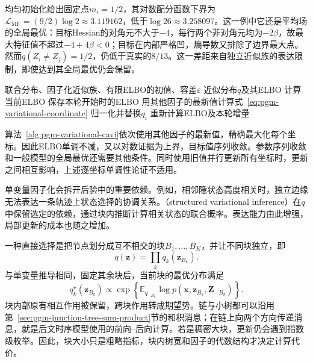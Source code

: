 均匀初始化给出固定点$m_i=1/2$，其对数配分函数下界为$\mathcal L_{\mathrm{MF}}=(9/2)\log2\approx3.119162$，低于$\log26\approx3.258097$。这一例中它还是平均场的全局最优：目标Hessian的对角元不大于$-4$，每行两个非对角元均为$-2\beta$，故最大特征值不超过$-4+4\beta<0$；目标在内部严格凹，熵导数又排除了边界最大点。然而$q(Z_i\ne Z_j)=1/2$，仍低于真实的$8/13$。这一差距来自独立近似族的表达限制，即使达到其全局最优仍会保留。

\begin{algorithm}[循环坐标平均场]
  \label{alg:pgm-variational-cavi}
  \begin{algorithmic}[1]
    \Require 联合分布、因子化近似族、有限ELBO的初值、容差$\varepsilon$
    \Ensure 近似分布$q$及其ELBO
    \State 计算当前ELBO
    \Repeat
      \State 保存本轮开始时的ELBO
        \State 用其他因子的最新值计算式~\eqref{eq:pgm-variational-coordinate}
        \State 归一化并替换$q_i$
      \EndFor
      \State 重新计算ELBO及本轮增量
  \end{algorithmic}
\end{algorithm}

算法~\ref{alg:pgm-variational-cavi}依次使用其他因子的最新值，精确最大化每个坐标。因此ELBO单调不减，又以对数证据为上界，目标值序列收敛。参数序列收敛和一般模型的全局最优还需要其他条件。同时使用旧值并行更新所有坐标时，更新之间相互影响，上述逐坐标单调性论证不适用。

单变量因子化会拆开后验中的重要依赖。例如，相邻隐状态高度相关时，独立边缘无法表达一条轨迹上状态选择的协调关系。（structured variational inference）在$q$中保留选定的依赖，通过块内推断计算相关状态的联合概率。表达能力由此增强，局部更新的成本也随之增加。
\label{sec:pgm-variational-structured}

一种直接选择是把节点划分成互不相交的块$B_1,\ldots,B_K$，并让不同块独立，即
\[
  q(\bm z)=\prod_k q_k(\bm z_{B_k}).
\]
与单变量推导相同，固定其余块后，当前块的最优分布满足
\begin{equation}
  q_k^\star(\bm z_{B_k})
     \propto\exp\left\{
       \mathbb E_{q_{-B_k}}\log p(\bm x,\bm z_{B_k},\bm Z_{-B_k})
     \right\}.
  \label{eq:pgm-variational-block}
\end{equation}
块内部原有相互作用被保留，跨块作用转成期望势。链与小树都可以沿用第~\ref{sec:pgm-junction-tree-sum-product}节的和积消息；在链上向两个方向传递消息，就是后文时序模型使用的前向--后向计算。若是稠密大块，更新仍会遇到指数级枚举。因此，块大小只是粗略指标，块内树宽和因子的代数结构才决定计算代价。


